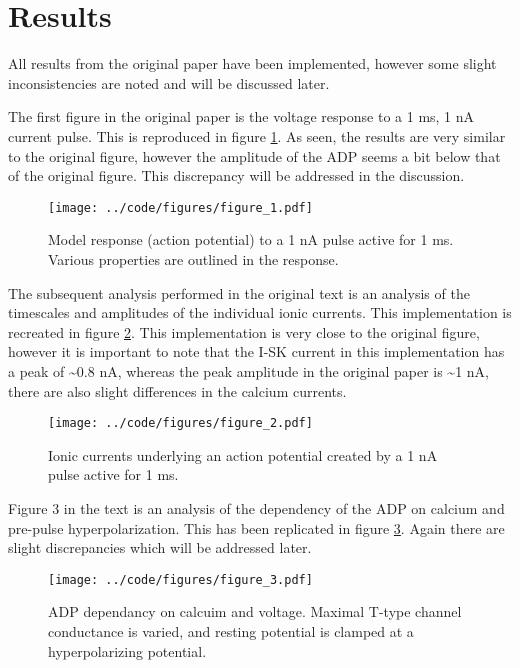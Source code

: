 \documentclass[10pt,a4paper,onecolumn]{article}
\renewcommand{\includegraphics}[2][]{\OldIncludegraphics[width=12cm, #1]{#2}}
\begin{document}
\section{Results}\label{results}

All results from the original paper have been implemented, however some
slight inconsistencies are noted and will be discussed later.

The first figure in the original paper is the voltage response to a 1
ms, 1 nA current pulse. This is reproduced in figure \ref{fig:fig1}. As
seen, the results are very similar to the original figure, however the
amplitude of the ADP seems a bit below that of the original figure. This
discrepancy will be addressed in the discussion.

\begin{figure}
\centering
\texttt{[image: ../code/figures/figure\_1.pdf]}
\caption{Model response (action potential) to a 1 nA pulse active for 1
ms. Various properties are outlined in the response. \label{fig:fig1}}
\end{figure}

The subsequent analysis performed in the original text is an analysis of
the timescales and amplitudes of the individual ionic currents. This
implementation is recreated in figure \ref{fig:fig2}. This
implementation is very close to the original figure, however it is
important to note that the I-SK current in this implementation has a
peak of \textasciitilde{}0.8 nA, whereas the peak amplitude in the
original paper is \textasciitilde{}1 nA, there are also slight
differences in the calcium currents.

\begin{figure}
\centering
\texttt{[image: ../code/figures/figure\_2.pdf]}
\caption{Ionic currents underlying an action potential created by a 1 nA
pulse active for 1 ms. \label{fig:fig2}}
\end{figure}

Figure 3 in the text is an analysis of the dependency of the ADP on
calcium and pre-pulse hyperpolarization. This has been replicated in
figure \ref{fig:fig3}. Again there are slight discrepancies which will
be addressed later.

\begin{figure}
\centering
\texttt{[image: ../code/figures/figure\_3.pdf]}
\caption{ADP dependancy on calcuim and voltage. Maximal T-type channel
conductance is varied, and resting potential is clamped at a
hyperpolarizing potential. \label{fig:fig3}}
\end{figure}
\end{document}
